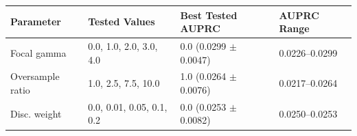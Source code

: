 \begin{tabular}{llll}
\toprule
\textbf{Parameter} & \textbf{Tested Values} & \textbf{Best Tested AUPRC} & \textbf{AUPRC Range} \\
\midrule
Focal gamma & 0.0, 1.0, 2.0, 3.0, 4.0 & 0.0 (0.0299 $\pm$ 0.0047) & 0.0226--0.0299 \\
Oversample ratio & 1.0, 2.5, 7.5, 10.0 & 1.0 (0.0264 $\pm$ 0.0076) & 0.0217--0.0264 \\
Disc. weight & 0.0, 0.01, 0.05, 0.1, 0.2 & 0.0 (0.0253 $\pm$ 0.0082) & 0.0250--0.0253 \\
\bottomrule
\end{tabular}
